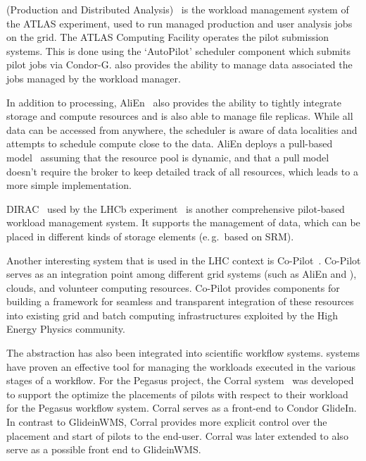 \documentclass{sig-alternate}
\begin{document}
\panda (Production and Distributed Analysis)~\cite{1742-6596-331-7-072069} is
the workload management system of the ATLAS experiment, used to run managed
production and user analysis jobs on the grid. The ATLAS Computing Facility
operates the pilot submission systems. This is done using the \panda `AutoPilot'
scheduler component which submits pilot jobs via Condor-G. \panda also provides
the ability to manage data associated the jobs managed by the \panda workload
manager.

In addition to processing, AliEn~\cite{1742-6596-119-6-062012} also provides the
ability to tightly integrate storage and compute resources and is also able to
manage file replicas. While all data can be accessed from anywhere, the
scheduler is aware of data localities and attempts to schedule compute close to
the data. AliEn deploys a pull-based model~\cite{Saiz:2003:alien} assuming that
the resource pool is dynamic, and that a pull model doesn't require the broker
to keep detailed track of all resources, which leads to a more simple
implementation.  

DIRAC~\cite{1742-6596-219-6-062049} used by the LHCb experiment~\cite{lhcb} is
another comprehensive pilot-based workload management system.
It supports the management of data, which can be placed in different
kinds of storage elements (e.\,g.\ based on SRM).

Another interesting \pilotjob system that is used in the LHC context is
Co-Pilot~\cite{copilot-tr}. Co-Pilot serves as an integration point among
different grid \pilotjob systems (such as AliEn and \panda), clouds, and
volunteer computing resources. Co-Pilot provides components for building a
framework for seamless and transparent integration of these resources into
existing grid and batch computing infrastructures exploited by the High Energy
Physics community.


The \pilot abstraction has also been integrated into scientific workflow
systems. \pilotjob systems have proven an effective tool for managing the
workloads executed in the various stages of a workflow. For the Pegasus
project\cite{deelman2015}, the Corral
system~\cite{Rynge:2011:EUG:2116259.2116599} was developed to support the
optimize the placements of pilots with respect to their workload for the
Pegasus workflow system. Corral serves as a front-end to Condor GlideIn. In
contrast to GlideinWMS, Corral provides more explicit control over the placement
and start of pilots to the end-user. Corral was later extended to also serve as
a possible front end to GlideinWMS.
\end{document}
